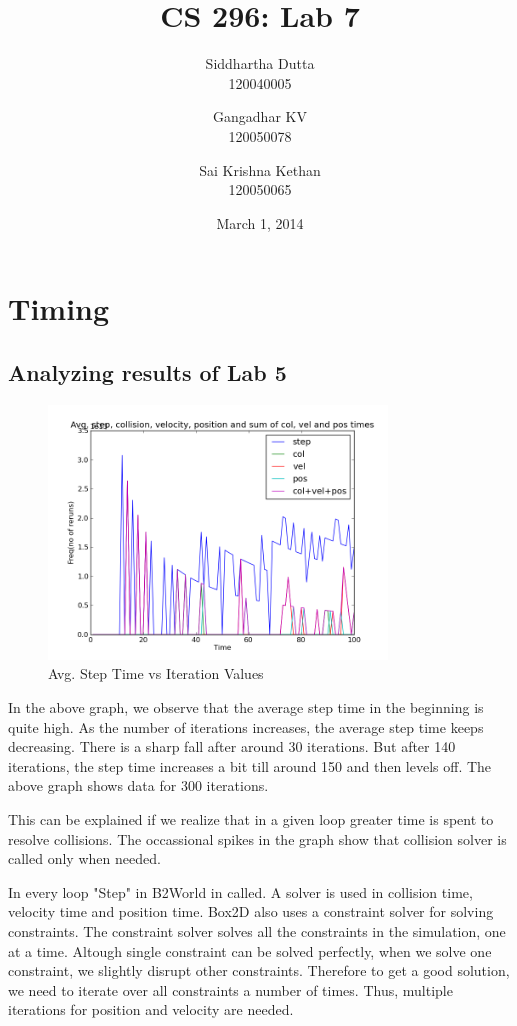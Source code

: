 \documentclass[11pt]{article}
\title{\textbf{CS 296: Lab 7}}
\author{Siddhartha Dutta \\ 120040005 \and Gangadhar KV \\ 120050078 \and Sai Krishna Kethan \\ 120050065}
\date{March 1, 2014}
\begin{document}
\maketitle

\section{Timing}
\subsection{Analyzing results of Lab 5}

\begin{figure}[ht!]
\centering
\includegraphics[width=90mm]{g32_lab09_plot02.png}
\caption{Avg. Step Time vs Iteration Values}
\label{overflow}
\end{figure}

In the above graph, we observe that the average step time in the beginning is quite high. As the number of iterations increases, the average step time keeps decreasing. There is a sharp fall after around 30 iterations. But after 140 iterations, the step time increases a bit till around 150 and then levels off. The above graph shows data for 300 iterations. 

This can be explained if we realize that in a given loop greater time is spent to resolve collisions. The occassional spikes in the graph show that collision solver is called only when needed.

In every loop "Step" in B2World in called. A solver is used in collision time, velocity time and position time. Box2D also uses a constraint solver for solving constraints. The constraint solver solves all the constraints in the simulation, one at a time. Altough single constraint can be solved perfectly, when we solve one constraint, we slightly disrupt other constraints. Therefore to get a good solution, we need to iterate over all constraints a number of times. Thus, multiple iterations for position and velocity are needed.
\end{document}
